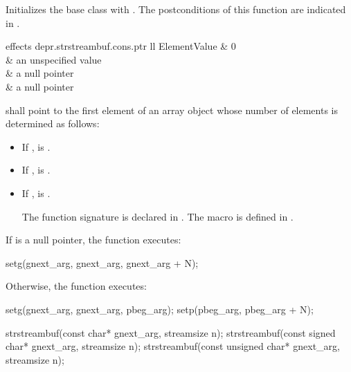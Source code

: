 \begin{itemdescr}
\pnum
\effects
Initializes the base class with .
The postconditions of this function are indicated in .

\begin{libtab2}{ effects}
{depr.strstreambuf.cons.ptr}
{ll}
{Element}{Value}
	&	0						\\
	&	an unspecified value	\\
	&	a null pointer			\\
	&	a null pointer			\\
\end{libtab2}

\pnum
{} shall point to the first element of an array
object whose number of elements  is determined as follows:
\begin{itemize}
\item
If
,
 is .
\item
If
,
 is
.
%
\item
If
,
 is
.
\begin{footnote}
The function signature
%
is declared in .
The macro  is defined in .
\end{footnote}
\end{itemize}

\pnum
If  is a null pointer, the function executes:
\begin{codeblock}
setg(gnext_arg, gnext_arg, gnext_arg + N);
\end{codeblock}

\pnum
Otherwise, the function executes:
\begin{codeblock}
setg(gnext_arg, gnext_arg, pbeg_arg);
setp(pbeg_arg,  pbeg_arg + N);
\end{codeblock}
\end{itemdescr}


%
\begin{itemdecl}
strstreambuf(const char* gnext_arg, streamsize n);
strstreambuf(const signed char* gnext_arg, streamsize n);
strstreambuf(const unsigned char* gnext_arg, streamsize n);
\end{itemdecl}

